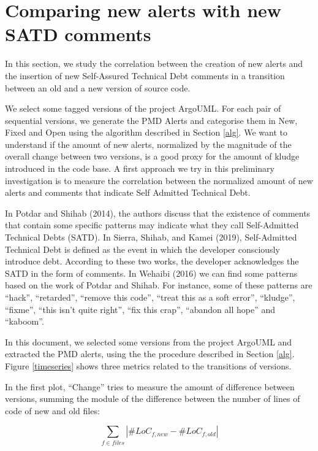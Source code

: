 \documentclass[
]{article}
\begin{document}
\normalsize

\section{Comparing new alerts with new SATD comments}\label{results}

In this section, we study the correlation between the creation of new
alerts and the insertion of new Self-Assured Technical Debt comments in
a transition between an old and a new version of source code.

We select some tagged versions of the project ArgoUML. For each pair of
sequential versions, we generate the PMD Alerts and categorise them in
New, Fixed and Open using the algorithm described in Section \ref{alg}.
We want to understand if the amount of new alerts, normalized by the
magnitude of the overall change between two versions, is a good proxy
for the amount of kludge introduced in the code base. A first approach
we try in this preliminary investigation is to measure the correlation
between the normalized amount of new alerts and comments that indicate
Self Admitted Technical Debt.

In Potdar and Shihab (2014), the authors discuss that the existence of
comments that contain some specific patterns may indicate what they call
Self-Admitted Technical Debts (SATD). In Sierra, Shihab, and Kamei
(2019), Self-Admitted Technical Debt is defined as the event in which
the developer consciously introduce debt. According to these two works,
the developer acknowledges the SATD in the form of comments. In Wehaibi
(2016) we can find some patterns based on the work of Potdar and Shihab.
For instance, some of these patterns are ``hack'', ``retarded'',
``remove this code'', ``treat this as a soft error'', ``kludge'',
``fixme'', ``this isn't quite right'', ``fix this crap'', ``abandon all
hope'' and ``kaboom''.

In this document, we selected some versions from the project ArgoUML and
extracted the PMD alerts, using the the procedure described in Section
\ref{alg}. Figure \ref{timeseries} shows three metrics related to the
transitions of versions.

In the first plot, ``Change'' tries to measure the amount of difference
between versions, summing the module of the difference between the
number of lines of code of new and old files:

\begin{equation} \label{eq_change} \sum_{f \in files}{|\#LoC_{f, new} - \#LoC_{f, old}|} \end{equation}
\end{document}
